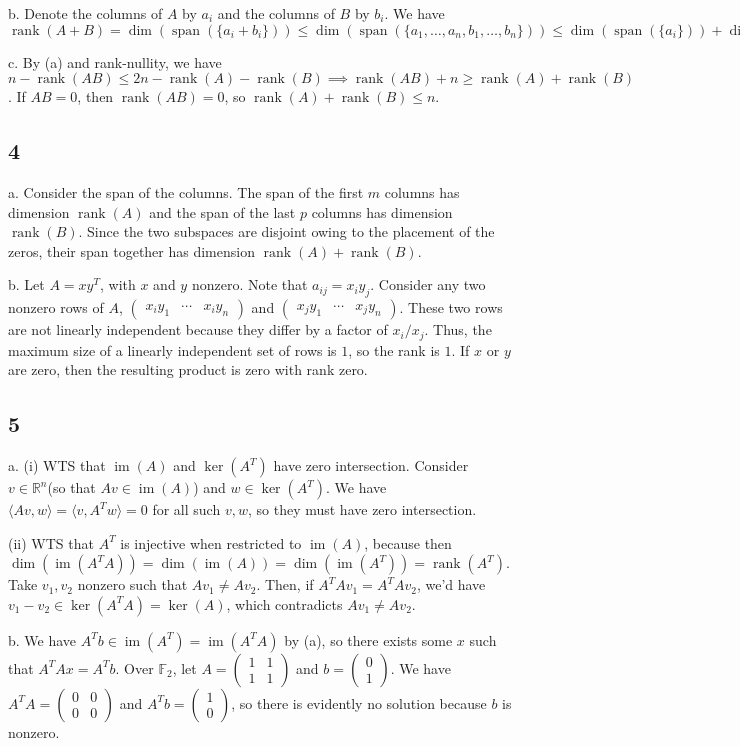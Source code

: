 \documentclass{article}
\newcommand{\openm}{\begin{pmatrix}}
\newcommand{\closem}{\end{pmatrix}}
\DeclareMathOperator{\rank}{rank}
\DeclareMathOperator{\im}{im}
\DeclareMathOperator{\Span}{span}
\newcommand{\rn}{\mathbb{R}}
\begin{document}
\noindent b. Denote the columns of $A$ by $a_i$ and the columns of $B$ by $b_i$. We have $\rank(A+B)=\dim(\Span(\{a_i+b_i\}))\leq\dim(\Span(\{a_1,\ldots,a_n,b_1,\ldots,b_n\}))\leq\dim(\Span(\{a_i\}))+\dim(\Span(\{b_i\}))$

\noindent c. By (a) and rank-nullity, we have $n-\rank(AB)\leq2n-\rank(A)-\rank(B)\implies\rank(AB)+n\geq\rank(A)+\rank(B)$. If $AB=0$, then $\rank(AB)=0$, so $\rank(A)+\rank(B)\leq n$.

\subsection*{4}
a. Consider the span of the columns. The span of the first $m$ columns has dimension $\rank(A)$ and the span of the last $p$ columns has dimension $\rank(B)$. Since the two subspaces are disjoint owing to the placement of the zeros, their span together has dimension $\rank(A)+\rank(B)$.

\noindent b. Let $A=xy^T$, with $x$ and $y$ nonzero. Note that $a_{ij}=x_iy_j$. Consider any two nonzero rows of $A$, $\openm x_iy_1&\cdots&x_iy_n\closem$ and $\openm x_jy_1&\cdots&x_jy_n\closem$. These two rows are not linearly independent because they differ by a factor of $x_i/x_j$. Thus, the maximum size of a linearly independent set of rows is $1$, so the rank is $1$. If $x$ or $y$ are zero, then the resulting product is zero with rank zero.

\subsection*{5}
a. (i) WTS that $\im(A)$ and $\ker(A^T)$ have zero intersection. Consider $v\in\rn^n$(so that $Av\in\im(A)$) and $w\in\ker(A^T)$. We have $\langle Av,w\rangle=\langle v,A^Tw\rangle=0$ for all such $v,w$, so they must have zero intersection. 

(ii) WTS that $A^T$ is injective when restricted to $\im(A)$, because then $\dim(\im(A^TA))=\dim(\im(A))=\dim(\im(A^T))=\rank(A^T)$. Take $v_1,v_2$ nonzero such that $Av_1\neq Av_2$. Then, if $A^TAv_1=A^TAv_2$, we'd have $v_1-v_2\in\ker(A^TA)=\ker(A)$, which contradicts $Av_1\neq Av_2$. 

\noindent b. We have $A^Tb\in\im(A^T)=\im(A^TA)$ by (a), so there exists some $x$ such that $A^TAx=A^Tb$. Over $\mathbb{F}_2$, let $A=\openm1&1\\1&1\closem$ and $b=\openm0\\1\closem$. We have $A^TA=\openm0&0\\0&0\closem$ and $A^Tb=\openm1\\0\closem$, so there is evidently no solution because $b$ is nonzero.
\end{document}
